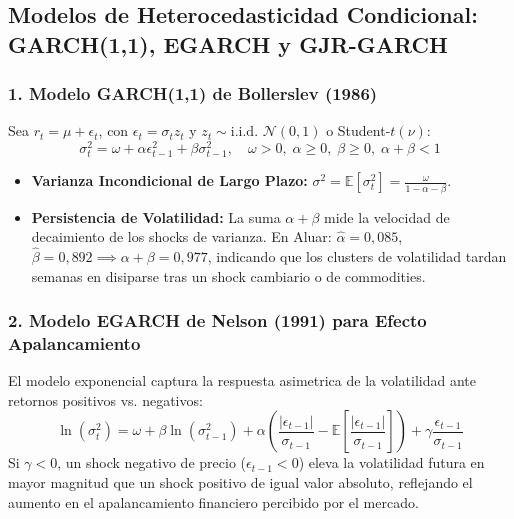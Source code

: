 \documentclass[10pt,a4paper]{article}
\theoremstyle{definition}
\begin{document}
\subsection{Modelos de Heterocedasticidad Condicional: GARCH(1,1), EGARCH y GJR-GARCH}

\subsubsection{1. Modelo GARCH(1,1) de Bollerslev (1986)}
Sea $r_t = \mu + \epsilon_t$, con $\epsilon_t = \sigma_t z_t$ y $z_t \sim \text{i.i.d. } \mathcal{N}(0, 1)$ o Student-$t(\nu)$:
\begin{equation}
\sigma_t^2 = \omega + \alpha \epsilon_{t-1}^2 + \beta \sigma_{t-1}^2, \quad \omega > 0, \; \alpha \ge 0, \; \beta \ge 0, \; \alpha + \beta < 1
\end{equation}
\begin{itemize}
    \item \textbf{Varianza Incondicional de Largo Plazo:} $\sigma^2 = \mathbb{E}[\sigma_t^2] = \frac{\omega}{1 - \alpha - \beta}$.
    \item \textbf{Persistencia de Volatilidad:} La suma $\alpha + \beta$ mide la velocidad de decaimiento de los shocks de varianza. En Aluar: $\hat{\alpha} = 0,085$, $\hat{\beta} = 0,892 \implies \alpha + \beta = 0,977$, indicando que los clusters de volatilidad tardan semanas en disiparse tras un shock cambiario o de commodities.
\end{itemize}

\subsubsection{2. Modelo EGARCH de Nelson (1991) para Efecto Apalancamiento}
El modelo exponencial captura la respuesta asimetrica de la volatilidad ante retornos positivos vs. negativos:
\begin{equation}
\ln(\sigma_t^2) = \omega + \beta \ln(\sigma_{t-1}^2) + \alpha \left( \frac{|\epsilon_{t-1}|}{\sigma_{t-1}} - \mathbb{E}\left[\frac{|\epsilon_{t-1}|}{\sigma_{t-1}}\right] \right) + \gamma \frac{\epsilon_{t-1}}{\sigma_{t-1}}
\end{equation}
Si $\gamma < 0$, un shock negativo de precio ($\epsilon_{t-1} < 0$) eleva la volatilidad futura en mayor magnitud que un shock positivo de igual valor absoluto, reflejando el aumento en el apalancamiento financiero percibido por el mercado.
\end{document}
